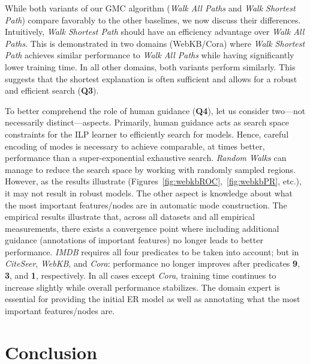 \documentclass[sigconf]{acmart}
\begin{document}
While both variants of our \textsc{GMC} algorithm (\textit{Walk All Paths} and \textit{Walk Shortest Path}) compare favorably to the other baselines, we now discuss their differences. Intuitively, \textit{Walk Shortest Path} should have an efficiency advantage over \textit{Walk All Paths}. This is demonstrated in two domains (WebKB/Cora) where \textit{Walk Shortest Path} achieves similar performance to \textit{Walk All Paths} while having significantly lower training time. In all other domains, both variants perform similarly. This suggests that the shortest explanation is often sufficient and allows for a robust and efficient search (\textbf{Q3}).


To better comprehend the role of human guidance (\textbf{Q4}), let us consider two---not necessarily distinct---aspects. Primarily, human guidance acts as search space constraints for the ILP learner to efficiently search for models. Hence, careful encoding of modes is necessary to achieve comparable, at times better, performance than a super-exponential exhaustive search. \textit{Random Walks} can manage to reduce the search space by working with randomly sampled regions. However, as the results illustrate (Figures~\ref{fig:webkbROC},~\ref{fig:webkbPR}, etc.), it may not result in robust models. The other aspect is knowledge about what the most important features/nodes are in automatic mode construction. The empirical results illustrate that, across all datasets and all empirical measurements, there exists a convergence point where including additional guidance (annotations of important features) no longer leads to better performance. \textit{IMDB} requires all four predicates to be taken into account; but in \textit{CiteSeer}, \textit{WebKB}, and \textit{Cora}: performance no longer improves after predicates \textbf{9}, \textbf{3}, and \textbf{1}, respectively. In all cases except \textit{Cora}, training time continues to increase slightly while overall performance stabilizes. The domain expert is essential for providing the initial ER model as well as annotating what the most important features/nodes are.

\section{Conclusion}
\end{document}
